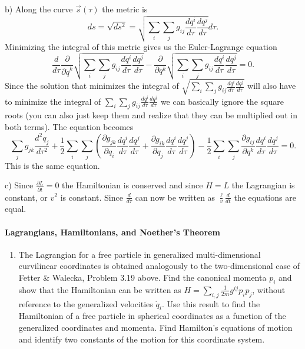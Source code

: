 \documentclass[letterpaper,11pt]{article}
\begin{document}
b) Along the curve $\vec{s}(\tau)$ the metric is
$$ds = \sqrt{ds^2} = \sqrt{\sum_i \sum_j g_{ij} \frac{dq^i}{d\tau} \frac{dq^j}{d\tau}} d\tau.$$
Minimizing the integral of this metric gives us the Euler-Lagrange equation
$$\frac{d}{d\tau} \frac{\partial}{\partial \dot{q}^k} \sqrt{\sum_i \sum_j g_{ij} \frac{dq^i}{d\tau} \frac{dq^j}{d\tau}} - \frac{\partial}{\partial q^k} \sqrt{\sum_i \sum_j g_{ij} \frac{dq^i}{d\tau} \frac{dq^j}{d\tau}} = 0.$$
Since the solution that minimizes the integral of $\sqrt{\sum_i \sum_j g_{ij} \frac{dq^i}{d\tau} \frac{dq^j}{d\tau}}$ will also have to minimize the integral of $\sum_i \sum_j g_{ij} \frac{dq^i}{d\tau} \frac{dq^j}{d\tau}$ we can basically ignore the square roots (you can also just keep them and realize that they can be multiplied out in both terms).  The equation becomes
\begin{equation*}
 \sum_j g_{jk} \frac{d^2 q_j}{d\tau^2} + \frac{1}{2} \sum_i \sum_j \left( \frac{\partial g_{jk}}{\partial q_i} \frac{d q^i}{d\tau} \frac{dq^j}{d\tau} + \frac{\partial g_{ik}}{\partial q_j} \frac{d q^i}{d\tau} \frac{dq^j}{d\tau} \right) - \frac{1}{2} \sum_i \sum_j \frac{\partial g_{ij}}{\partial q^k} \frac{dq^i}{d\tau} \frac{dq^j}{d\tau} = 0.
\end{equation*}
This is the same equation.

c) Since $\frac{\partial L}{\partial t} = 0$ the Hamiltonian is conserved and since $H = L$ the Lagrangian is constant, or $v^2$ is constant.  Since $\frac{d}{d\tau}$ can now be written as $\frac{\ell}{v} \frac{d}{dt}$ the equations are equal.


\paragraph*{Lagrangians, Hamiltonians, and Noether's Theorem}
\begin{enumerate}[resume]
 \item The Lagrangian for a free particle in generalized multi-dimensional curvilinear coordinates is obtained analogously to the two-dimensional case of Fetter \& Walecka, Problem 3.19 above.  Find the canonical momenta $p_i$ and show that the Hamiltonian can be written as $H = \sum_{i,j} \frac{1}{2m} g^{ij} p_i p_j$, without reference to the generalized velocities $\dot{q}_i$.  Use this result to find the Hamiltonian of a free particle in spherical coordinates as a function of the generalized coordinates and momenta.  Find Hamilton's equations of motion and identify two constants of the motion for this coordinate system.
\end{enumerate}
\end{document}
